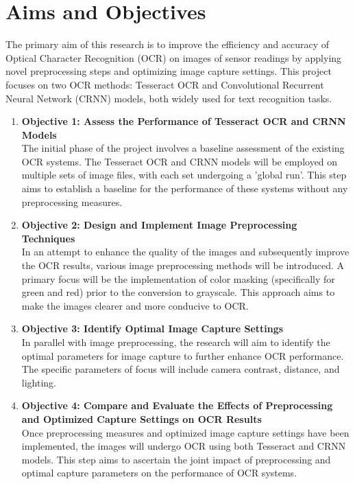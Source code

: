 \section{Aims and Objectives}
The primary aim of this research is to improve the efficiency and accuracy of Optical Character Recognition (OCR) on images of sensor readings by applying novel preprocessing steps and optimizing image capture settings. This project focuses on two OCR methods: Tesseract OCR and Convolutional Recurrent Neural Network (CRNN) models, both widely used for text recognition tasks.

\begin{enumerate}
    \item \textbf{Objective 1: Assess the Performance of Tesseract OCR and CRNN Models}\\
          The initial phase of the project involves a baseline assessment of the existing OCR systems. The Tesseract OCR and CRNN models will be employed on multiple sets of image files, with each set undergoing a 'global run'. This step aims to establish a baseline for the performance of these systems without any preprocessing measures.

    \item \textbf{Objective 2: Design and Implement Image Preprocessing Techniques}\\
          In an attempt to enhance the quality of the images and subsequently improve the OCR results, various image preprocessing methods will be introduced. A primary focus will be the implementation of color masking (specifically for green and red) prior to the conversion to grayscale. This approach aims to make the images clearer and more conducive to OCR.

    \item \textbf{Objective 3: Identify Optimal Image Capture Settings}\\
          In parallel with image preprocessing, the research will aim to identify the optimal parameters for image capture to further enhance OCR performance. The specific parameters of focus will include camera contrast, distance, and lighting.

    \item \textbf{Objective 4: Compare and Evaluate the Effects of Preprocessing and Optimized Capture Settings on OCR Results}\\
          Once preprocessing measures and optimized image capture settings have been implemented, the images will undergo OCR using both Tesseract and CRNN models. This step aims to ascertain the joint impact of preprocessing and optimal capture parameters on the performance of OCR systems.


\end{enumerate}
